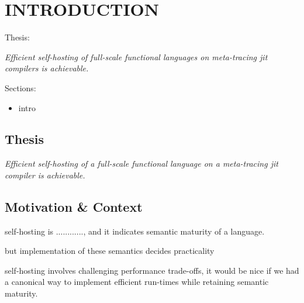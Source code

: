 \chapter[\texorpdfstring{INTRODUCTION}
                          {1. Introduction}]{INTRODUCTION}
    \label{chapter:introduction}

    \begin{chaptersynopsis}

       Thesis:

        \textit{Efficient self-hosting of full-scale functional languages on meta-tracing \gls{jit} compilers is achievable.}

        \vspace{2em}

        Sections:
		\begin{itemize}
			\item intro
		\end{itemize}
    \end{chaptersynopsis}

    \section{Thesis}

    \textit{Efficient self-hosting of a full-scale functional language on a meta-tracing \gls{jit} compiler is achievable.}


    \section[\texorpdfstring{Motivation \& Context}{Context}]{Motivation \& Context}

    \begin{paragraph-here}%
        self-hosting is ............, and it indicates semantic maturity of a language.
    \end{paragraph-here}

    \begin{paragraph-here}%
        but implementation of these semantics decides practicality
    \end{paragraph-here}

    \begin{paragraph-here}%
        self-hosting involves challenging performance trade-offs, it would be nice if we had a canonical way to implement efficient run-times while retaining semantic maturity.
    \end{paragraph-here}

